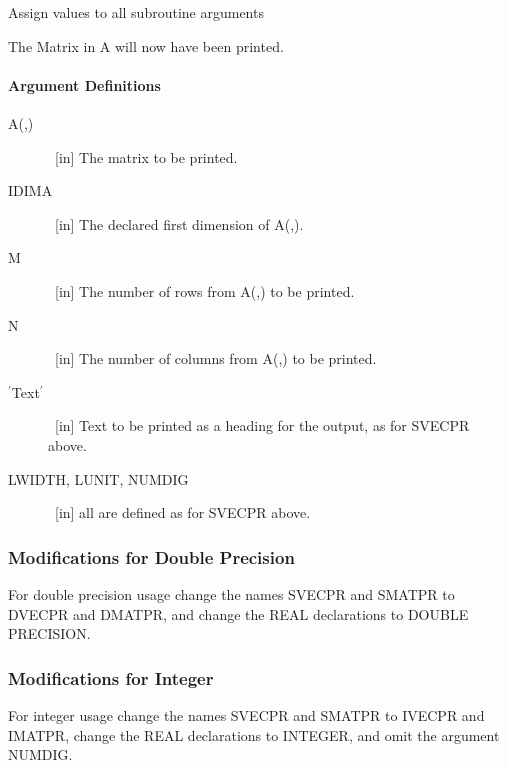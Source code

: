 \documentclass[twoside]{MATH77}
\begin{document}
Assign values to all subroutine arguments

\begin{center}
\end{center}

The Matrix in A will now have been printed.

\paragraph{Argument Definitions}

\begin{description}

\item[A(,)] \ [in] The matrix to be printed.

\item[IDIMA] \ [in] The declared first dimension of A(,).

\item[M] \ [in] The number of rows from A(,) to be printed.

\item[N] \ [in] The number of columns from A(,) to be printed.

\item[$^{\prime}$Text$^{\prime}$] \ [in] Text to be printed as a heading for the
output, as for SVECPR above.

\item[LWIDTH, LUNIT, NUMDIG] \ [in] all are defined as for SVECPR above.
\end{description}

\subsubsection{Modifications for Double Precision}

For double precision usage change the names SVECPR and SMATPR to DVECPR and
DMATPR, and change the REAL declarations to DOUBLE PRECISION.

\subsubsection{Modifications for Integer}

For integer usage change the names SVECPR and SMATPR to IVECPR and IMATPR,
change the REAL declarations to INTEGER, and omit the argument NUMDIG.
\end{document}
